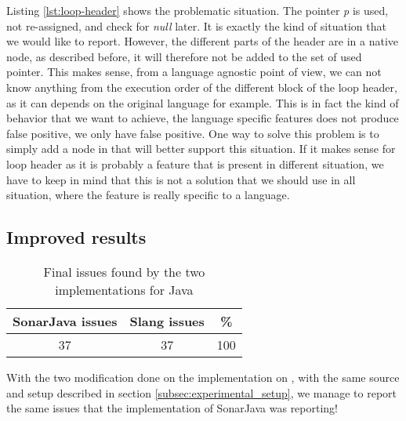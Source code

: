 

Listing \ref{lst:loop-header} shows the problematic situation. The pointer \emph{p} is used, not re-assigned, and check for \emph{null} later. 
It is exactly the kind of situation that we would like to report. 
However, the different parts of the header are in a native node, as described before, it will therefore not be added to the set of used pointer. 
This makes sense, from a language agnostic point of view, we can not know anything from the execution order of the different block of the loop header, as it can depends on the original language for example. 
This is in fact the kind of behavior that we want to achieve, the language specific features does not produce false positive, we only have false positive. 
One way to solve this problem is to simply add a node in \slang{} that will better support this situation. 
If it makes sense for loop header as it is probably a feature that is present in different situation, we have to keep in mind that this is not a solution that we should use in all situation, where the feature is really specific to a language.

\subsection{Improved results}
\label{subsec:improved_results}

\begin{table}[h]
	\centering
	\caption{Final issues found by the two implementations for Java}
	\label{table:final-sonarjava-vs-slang}
	\begin{tabular}{|c|c|c|}
		\hline
		\bf SonarJava issues & \bf Slang issues & \bf \% \\ \hline
		37 &  37 &  100 \\ \hline
	\end{tabular}
\end{table}

With the two modification done on the implementation on \slang{}, with the same source and setup described in section \ref{subsec:experimental_setup}, we manage to report the same issues that the implementation of SonarJava was reporting!

